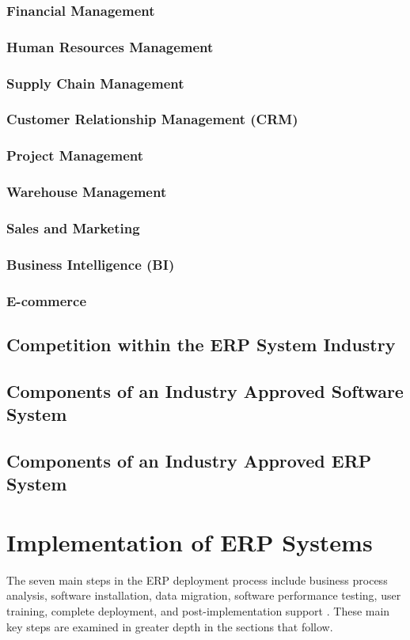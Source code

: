 \subsubsection{Financial Management}
\subsubsection{Human Resources Management}
\subsubsection{Supply Chain Management}
\subsubsection{Customer Relationship Management (CRM)}
\subsubsection{Project Management}
\subsubsection{Warehouse Management}
\subsubsection{Sales and Marketing}
\subsubsection{Business Intelligence (BI)}
\subsubsection{E-commerce}
\subsection{Competition within the ERP System Industry}
\subsection{Components of an Industry Approved Software System}
\subsection{Components of an Industry Approved ERP System}

\section{Implementation of ERP Systems}
\par{The seven main steps in the ERP deployment process include business process analysis, software installation, data migration, software performance testing, user training, complete deployment, and post-implementation support \citep{ly2020definitive}. These main key steps are examined in greater depth in the sections that follow.}
